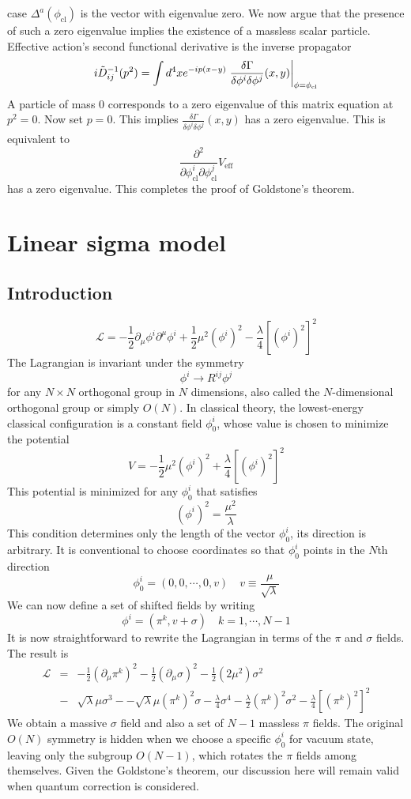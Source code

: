 \begin{newproof}
case $\Delta^a(\phi_{\mathrm{cl}})$ is the vector with eigenvalue zero.
We now argue that the presence of such a zero eigenvalue implies the existence of a massless scalar particle. Effective action's second functional derivative is the inverse propagator
\[i\tilde{D}_{ij}^{-1}(p^2) = \int d^4x e^{-ip(x-y)} \left. \frac{\delta \Gamma}{\delta \phi^i \delta \phi^j}(x,y) \right|_{\phi = \phi_{\rm cl}}\]
A particle of mass $0$ corresponds to a zero eigenvalue of this matrix equation at $p^2 = 0$. Now set $p=0$. This implies $\frac{\delta \Gamma}{\delta \phi^i \delta \phi^j}(x,y)$ has a zero eigenvalue. This is equivalent to 
\[\frac{\partial^2}{\partial \phi^i_{\mathrm{cl}} \partial \phi^j_{\mathrm{cl}}}V_{\mathrm{eff}}\]
has a zero eigenvalue. This completes the proof of Goldstone's theorem.
\end{newproof}

\section{Linear sigma model}
\subsection{Introduction}
\[\mathcal{L} = -\frac{1}{2} \partial_{\mu} \phi^i \partial^{\mu}\phi^i + \frac{1}{2} \mu^2 (\phi^i)^2 - \frac{\lambda}{4} [(\phi^i)^2]^2\]
The Lagrangian is invariant under the symmetry
\[\phi^i \to R^{ij} \phi^j\]
for any $N \times N$ orthogonal group in $N$ dimensions, also called the $N$-dimensional orthogonal group or simply $O(N)$. In classical theory, the lowest-energy classical configuration is a constant field $\phi_0^i$, whose value is chosen to minimize the potential
\[V = -\frac{1}{2}\mu^2 (\phi^i)^2 + \frac{\lambda}{4}[(\phi^i)^2]^2\]
This potential is minimized for any $\phi_0^i$ that satisfies
\[(\phi^i)^2 = \frac{\mu^2}{\lambda} \]
This condition determines only the length of the vector $\phi_0^i$, its direction is arbitrary. 
It is conventional to choose coordinates so that $\phi_0^i$ points in the $N$th direction
\[\phi_0^i = (0,0,\cdots,0,v) \quad v \equiv \frac{\mu}{\sqrt{\lambda}}\]
We can now define a set of shifted fields by writing
\[\phi^i = (\pi^k,v+\sigma) \quad k = 1,\cdots,N-1\]
It is now straightforward to rewrite the Lagrangian in terms of the $\pi$ and $\sigma$ fields. The result is
\begin{eqnarray}
\mathcal{L} &=& -\frac{1}{2}(\partial_{\mu}\pi^k)^2 - \frac{1}{2}(\partial_{\mu}\sigma)^2 - \frac{1}{2}(2\mu^2)\sigma^2 \nonumber \\
&-& \sqrt{\lambda}\mu \sigma^3 - -\sqrt{\lambda}\mu (\pi^k)^2\sigma - \frac{\lambda}{4}\sigma^4 - \frac{\lambda}{2}(\pi^k)^2\sigma^2 - \frac{\lambda}{4}[(\pi^k)^2]^2 \nonumber
\end{eqnarray}
We obtain a massive $\sigma$ field and also a set of $N-1$ massless $\pi$ fields. The original $O(N)$ symmetry is hidden when we choose a specific $\phi_0^i$ for vacuum state, leaving only the subgroup $O(N-1)$, which rotates the $\pi$ fields among themselves. Given the Goldstone's theorem, our discussion here will remain valid when quantum correction is considered.

